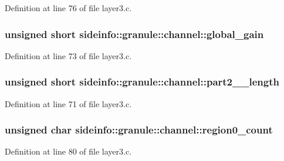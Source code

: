 Definition at line 76 of file layer3.\+c.

\subsubsection[{\texorpdfstring{global\+\_\+gain}{global_gain}}]{\setlength{\rightskip}{0pt plus 5cm}unsigned short sideinfo\+::granule\+::channel\+::global\+\_\+gain}\hypertarget{structsideinfo_1_1granule_1_1channel_afef63e5f5ebf2781745789ad573b25f0}{}\label{structsideinfo_1_1granule_1_1channel_afef63e5f5ebf2781745789ad573b25f0}


Definition at line 73 of file layer3.\+c.

\subsubsection[{\texorpdfstring{part2\+\_\+3\+\_\+length}{part2_3_length}}]{\setlength{\rightskip}{0pt plus 5cm}unsigned short sideinfo\+::granule\+::channel\+::part2\+\_\+\_\+length}\hypertarget{structsideinfo_1_1granule_1_1channel_ab91b3f248c847aa0cb42059aba1d25de}{}\label{structsideinfo_1_1granule_1_1channel_ab91b3f248c847aa0cb42059aba1d25de}


Definition at line 71 of file layer3.\+c.

\subsubsection[{\texorpdfstring{region0\+\_\+count}{region0_count}}]{\setlength{\rightskip}{0pt plus 5cm}unsigned char sideinfo\+::granule\+::channel\+::region0\+\_\+count}\hypertarget{structsideinfo_1_1granule_1_1channel_a1f3d769302d1b0a2d0ac91ee3fd7fd3e}{}\label{structsideinfo_1_1granule_1_1channel_a1f3d769302d1b0a2d0ac91ee3fd7fd3e}


Definition at line 80 of file layer3.\+c.

